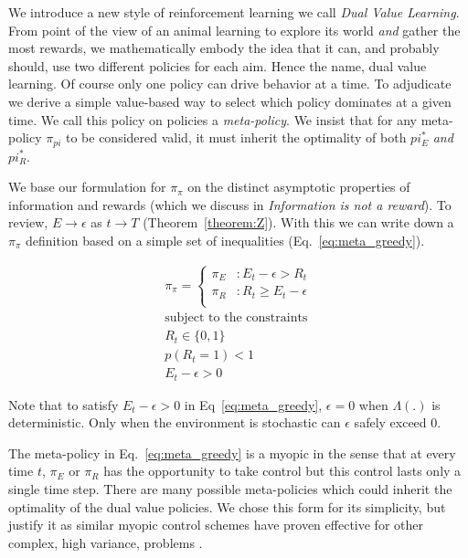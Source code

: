 \documentclass[9pt,twocolumn,twoside]{pnas-new}
\begin{document}
We introduce a new style of reinforcement learning we call \textit{Dual Value Learning}. From point of the view of an animal learning to explore its world \textit{and} gather the most rewards, we mathematically embody the idea that it can, and probably should, use two different policies for each aim. Hence the name, dual value learning. Of course only one policy can drive behavior at a time. To adjudicate we derive a simple value-based way %
 to select which policy dominates at a given time. We call this policy on policies a \textit{meta-policy}. We insist that for any meta-policy $\pi_{pi}$ to be considered valid, it must inherit the optimality of both $pi^*_E$ \textit{and} $pi^*_R$. 
 
 We base our formulation for $\pi_{\pi}$ on the distinct asymptotic properties of information and rewards (which we discuss in \textit{Information is not a reward}). To review, $E \rightarrow \epsilon$ as $t \rightarrow T$ (Theorem~\ref{theorem:Z}). With this we can write down a $\pi_{\pi}$ definition based on a simple set of inequalities (Eq.~\ref{eq:meta_greedy}). 

\begin{equation} \label{eq:meta_greedy}
    \begin{split}
        \pi_{\pi} = 
        \begin{cases}
            \pi_E & : E_t - \epsilon > R_t \\
            \pi_R & : R_t \geq E_t - \epsilon \\
        \end{cases}\\
        \text{subject to the constraints}\\
        R_t \in \{0, 1\}\\ 
        p(R_t = 1) < 1\\
        E_t - \epsilon > 0
    \end{split}
\end{equation}

Note that to satisfy $E_t - \epsilon > 0$ in Eq~\ref{eq:meta_greedy}, $\epsilon = 0$ when $\Lambda(.)$ is deterministic. Only when the environment is stochastic can $\epsilon$ safely exceed 0.

The meta-policy in Eq.~\ref{eq:meta_greedy} is a myopic in the sense that at every time $t$, $\pi_E$ or $\pi_R$ has the opportunity to take control but this control lasts only a single time step. There are many possible meta-policies which could inherit the optimality of the dual value policies. We chose this form for its simplicity, but justify it as similar myopic control schemes have proven effective for other complex, high variance, problems \cite{Hocker2019}.
\end{document}
